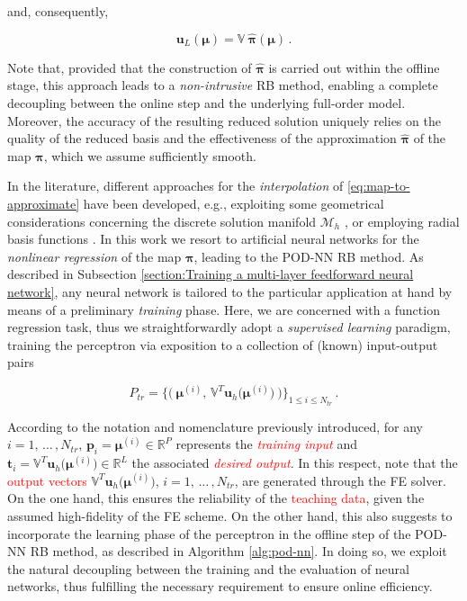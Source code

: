\documentclass[longtitle]{elsarticle}
\numberwithin{equation}{section}
\theoremstyle{theorem}
\theoremstyle{definition}
\theoremstyle{remark}
\theoremstyle{proposition}
\numberwithin{figure}{section}
\newcommand{\bg}[1]{\boldsymbol{#1}}
\begin{document}
		and, consequently,
		\begin{linenomath}\begin{equation*}
			\mathbf{u}_L(\bg{\mu}) = \mathbb{V} ~ \hat{\bg{\pi}}(\bg{\mu}) \, .
		\end{equation*}\end{linenomath}
		Note that, provided that the construction of $\hat{\bg{\pi}}$ is carried out within the offline stage, this approach leads to a \emph{non-intrusive} RB method, enabling a complete decoupling between the online step and the underlying full-order model. Moreover, the accuracy of the resulting reduced solution uniquely relies on the quality of the reduced basis and the effectiveness of the approximation $\hat{\bg{\pi}}$ of the map $\bg{\pi}$, which we assume sufficiently smooth. 

		In the literature, different approaches for the \emph{interpolation} of \eqref{eq:map-to-approximate} have been developed, e.g., exploiting some geometrical considerations concerning the discrete solution manifold $\mathcal{M}_h$ \cite{Ams10}, or employing radial basis functions \cite{Chen17}. In this work we resort to artificial neural networks for the \emph{nonlinear regression} of the map $\bg{\pi}$, leading to the POD-NN RB method. As described in Subsection \ref{section:Training a multi-layer feedforward neural network}, any neural network is tailored to the particular application at hand by means of a preliminary \emph{training} phase. Here, we are concerned with a function regression task, thus we straightforwardly adopt a \emph{supervised learning} paradigm, training the perceptron via exposition to a collection of (known) input-output pairs
		\begin{linenomath}\begin{equation*}
			P_{tr} = \big\lbrace \big( ~ \bg{\mu}^{(i)}, \, \mathbb{V}^T \mathbf{u}_h \big( \bg{\mu}^{(i)} \big) ~ \big) \big\rbrace_{1 \leq i \leq N_{tr}} \, .
		\end{equation*}\end{linenomath} 
		According to the notation and nomenclature previously introduced, for any $i = 1, \, \ldots \, , N_{tr}$, $\mathbf{p}_i = \bg{\mu}^{(i)} \in \mathbb{R}^P$ represents the \textcolor{red}{\emph{training input}} and $\mathbf{t}_i =  \mathbb{V}^T \mathbf{u}_h \big( \bg{\mu}^{(i)} \big) \in \mathbb{R}^L$ the associated \textcolor{red}{\emph{desired output}}. In this respect, note that the \textcolor{red}{output vectors} $\mathbb{V}^T \mathbf{u}_h \big( \bg{\mu}^{(i)} \big)$, $i = 1, \, \ldots \, , N_{tr}$, are generated through the FE solver. On the one hand, this ensures the reliability of the \textcolor{red}{teaching data}, given the assumed high-fidelity of the FE scheme.	On the other hand, this also suggests to incorporate the learning phase of the perceptron in the offline step of the POD-NN RB method, as described in Algorithm \ref{alg:pod-nn}. In doing so, we exploit the natural decoupling between the training and the evaluation of neural networks, thus fulfilling the necessary requirement to ensure online efficiency. 						
\end{document}
